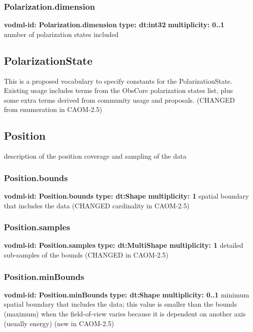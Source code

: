     \subsubsection{Polarization.dimension}
      \textbf{vodml-id: Polarization.dimension} \newline
      \textbf{type: dt:int32} \newline
      \textbf{multiplicity: 0..1} \newline
      number of polarization states included

  \subsection{PolarizationState}
  \label{sect:PolarizationState}
    This is a proposed vocabulary to specify constants for the PolarizationState. Existing usage includes terms from the ObsCore polarization states list, plus some extra terms derived from community usage and proposals. (CHANGED from enumeration in CAOM-2.5)

  \subsection{Position}
  \label{sect:Position}
    description of the position coverage and sampling of the data

    \subsubsection{Position.bounds}
      \textbf{vodml-id: Position.bounds} \newline
      \textbf{type: dt:Shape} \newline
      \textbf{multiplicity: 1} \newline
      spatial boundary that includes the data (CHANGED cardinality in CAOM-2.5)

    \subsubsection{Position.samples}
      \textbf{vodml-id: Position.samples} \newline
      \textbf{type: dt:MultiShape} \newline
      \textbf{multiplicity: 1} \newline
      detailed sub-samples of the bounds (CHANGED in CAOM-2.5)

    \subsubsection{Position.minBounds}
      \textbf{vodml-id: Position.minBounds} \newline
      \textbf{type: dt:Shape} \newline
      \textbf{multiplicity: 0..1} \newline
      minimum spatial boundary that includes the data; this value is smaller than the bounds (maximum) when the field-of-view varies because it is dependent on another axis (usually energy) (new in CAOM-2.5)

